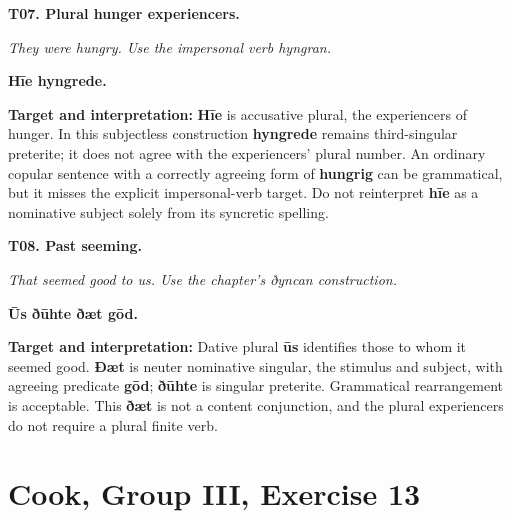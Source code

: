\par\begin{minipage}{\linewidth}\raggedright
\textbf{T07. Plural hunger experiencers.}

\emph{They were hungry. Use the impersonal verb hyngran.}

\textbf{Hīe hyngrede.}

\textbf{Target and interpretation:} \textbf{Hīe} is accusative plural, the experiencers of hunger. In this subjectless construction \textbf{hyngrede} remains third-singular preterite; it does not agree with the experiencers' plural number. An ordinary copular sentence with a correctly agreeing form of \textbf{hungrig} can be grammatical, but it misses the explicit impersonal-verb target. Do not reinterpret \textbf{hīe} as a nominative subject solely from its syncretic spelling.

\end{minipage}\par\addvspace{4pt}

\par\begin{minipage}{\linewidth}\raggedright
\textbf{T08. Past seeming.}

\emph{That seemed good to us. Use the chapter’s ðyncan construction.}

\textbf{Ūs ðūhte ðæt gōd.}

\textbf{Target and interpretation:} Dative plural \textbf{ūs} identifies those to whom it seemed good. \textbf{Ðæt} is neuter nominative singular, the stimulus and subject, with agreeing predicate \textbf{gōd}; \textbf{ðūhte} is singular preterite. Grammatical rearrangement is acceptable. This \textbf{ðæt} is not a content conjunction, and the plural experiencers do not require a plural finite verb.

\end{minipage}\par\addvspace{4pt}

\section*{Cook, Group III, Exercise 13}


